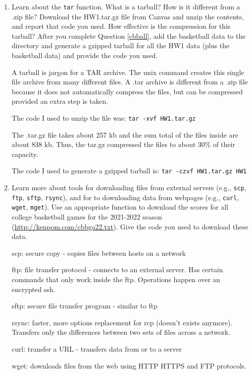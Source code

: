 \documentclass[11pt]{article}
\begin{document}
\begin{enumerate}
	\item Learn about the \texttt{tar} function. What is a tarball? How is it different from a .zip file? Download the HW1.tar.gz file from Canvas and unzip the contents, and report that code you used. How effective is the compression for this tarball? After you complete Question \ref{cbball}, add the basketball data to the directory and generate a gzipped tarball for all the HW1 data (plus the basketball data) and provide the code you used. 
	
	A tarball is jargon for a TAR archive. The unix command creates this single file archive from many different files. A .tar archive is different from a .zip file because it does not automatically compress the files, but can be compressed provided an extra step is taken. 
	
	The code I used to unzip the file was: \texttt{tar -xvf HW1.tar.gz} 
	
	The .tar.gz file takes about 257 kb and the sum total of the files inside are about 838 kb. Thus, the tar.gz compressed the files to about 30\% of their capacity. 
	
	The code I used to generate a gzipped tarball is: \texttt{tar -czvf HW1.tar.gz HW1}
	
	\item \label{cbball} Learn more about tools for downloading files from external servers (e.g., \texttt{scp}, \texttt{ftp}, \texttt{sftp}, \texttt{rsync}), and for to downloading data from webpages (e.g., \texttt{curl}, \texttt{wget}, \texttt{mget}). Use an appropriate function to download the scores for all college basketball games for the 2021-2022 season (\href{http://kenpom.com/cbbga22.txt}{http://kenpom.com/cbbga22.txt}). Give the code you used to download these data.
	
	scp: secure copy - copies files between hosts on a network
	
	ftp: file transfer protocol - connects to an external server. Has certain commands that only work inside the ftp. Operations happen over an encrypted ssh.
	
	sftp: secure file transfer program - similar to ftp
	
	rsync: faster, more options replacement for rcp (doesn't exists anymore). Transfers only the differences between two sets of files across a network.  
	
	curl: transfer a URL - transfers data from or to a server
	
	wget: downloads files from the web using HTTP HTTPS and FTP protocols.
	

\end{enumerate}
\end{document}
